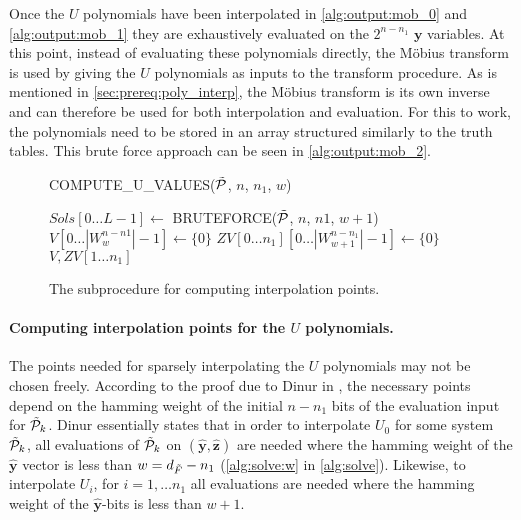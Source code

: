 Once the $U$ polynomials have been interpolated in \cref{alg:output:mob_0} and \cref{alg:output:mob_1} they are exhaustively evaluated on the $2^{n - n_1}$ $\mathbf{y}$ variables. At this point, instead of evaluating these polynomials directly, the Möbius transform is used by giving the $U$ polynomials as inputs to the transform procedure. As is mentioned in \cref{sec:prereq:poly_interp}, the Möbius transform is its own inverse and can therefore be used for both interpolation and evaluation. For this to work, the polynomials need to be stored in an array structured similarly to the truth tables. This brute force approach can be seen in \cref{alg:output:mob_2}.

\begin{figure}[ht]
    \centering
    \begin{alg}
        \caption{COMPUTE\_U\_VALUES($\Tilde{\mathcal{P}}$, $n$, $n_1$, $w$)} \label{alg:uvalue}
        \label{alg:uvalues}
        $Sols[0\dots L - 1] \gets$ BRUTEFORCE($\Tilde{\mathcal{P}}$, $n$, $n1$, $w + 1$)\; \label{alg:uvalues:bruteforce}
        $V[0\dots |W^{n - n1}_w| - 1] \gets \{0\}$\;
        $ZV[0\dots n_1][0\dots |W^{n - n_1}_{w + 1}| - 1] \gets \{0\}$\;
        \Return $V, ZV[1\dots n_1]$\;
    \end{alg}
    \caption{The subprocedure for computing interpolation points.}
\end{figure}

\paragraph{Computing interpolation points for the $U$ polynomials.} The points needed for sparsely interpolating the $U$ polynomials may not be chosen freely. According to the proof due to Dinur in \cite{eurocrypt-2021-30841}, the necessary points depend on the hamming weight of the initial $n - n_1$ bits of the evaluation input for $\Tilde{\mathcal{P}}_k$. Dinur essentially states that in order to interpolate $U_0$ for some system $\Tilde{\mathcal{P}}_k$, all evaluations of $\Tilde{\mathcal{P}}_k$ on $(\hat{\mathbf{y}}, \hat{\mathbf{z}})$ are needed where the hamming weight of the $\hat{\mathbf{y}}$ vector is less than $w = d_{\Tilde{F}} - n_1$ (\cref{alg:solve:w} in \cref{alg:solve}). Likewise, to interpolate $U_i$, for $i = 1, \dots n_1$ all evaluations are needed where the hamming weight of the $\hat{\mathbf{y}}$-bits is less than $w + 1$.

